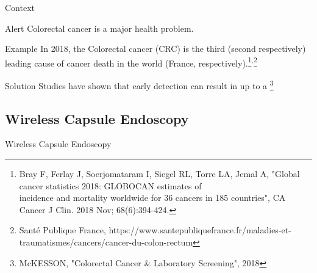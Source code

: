 \documentclass{libs/ufc_format}
\begin{document}
\begin{frame}{Context}
\begin{alertblock}{Alert}
         Colorectal cancer is a major health problem.
    \end{alertblock}
    \pause
\begin{block}{Example}
        In 2018, the Colorectal cancer (CRC) is the third (second respectively) leading cause of cancer death in the world (France, respectively).\footnote[frame]{\tiny Bray F, Ferlay J, Soerjomataram I, Siegel RL, Torre LA, Jemal A, "Global cancer statistics 2018: GLOBOCAN estimates of \\ \hspace{0.3cm}incidence and mortality worldwide for 36 cancers in 185 countries", CA Cancer J Clin. 2018 Nov; 68(6):394-424.}$^{,}$\footnote[frame]{\tiny Santé Publique France, https://www.santepubliquefrance.fr/maladies-et-traumatismes/cancers/cancer-du-colon-rectum}
    \end{block}
\pause
    \begin{exampleblock}{Solution}
        Studies have shown that early detection can result in up to a \footnote[frame]{\tiny McKESSON, "Colorectal Cancer \& Laboratory Screening", 2018}
    \end{exampleblock}  
    
\end{frame}


\subsection{Wireless Capsule Endoscopy}
\begin{frame}{Wireless Capsule Endoscopy}

    
    \pause
    
    
\end{frame}
\end{document}
